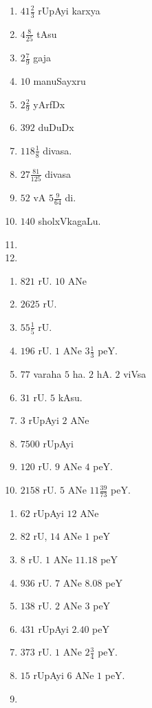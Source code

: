 
\begin{multicols}{3}
\begin{enumerate}[$(1)$]
\item $41 \frac{2}{3}$ rUpAyi karxya
\item $4 \frac{8}{25}$ tAsu
\item $2\frac{7}{9}$ gaja
\item $10$ manuSayxru
\item $2 \frac{2}{9}$ yArfDx
\item $392$ duDuDx
\item $118\frac{1}{8}$ divasa.
\item $27 \frac{81}{125}$ divasa
\item $52$ vA $5 \frac{9}{64}$ di.
\item $140$ sholxVkagaLu.
\item[]
\item[]
\end{enumerate}
\end{multicols}



\begin{multicols}{2}
\begin{enumerate}[$(1)$]
\item $821$ rU. $10$ ANe
\item $2625$ rU. 
\item $55\frac{1}{5}$ rU.
\item $196$ rU. $1$ ANe $3\frac{1}{3}$ peY.
\item $77$ varaha $5$ ha. $2$ hA. $2$ viVsa
\item $31$ rU. $5$ kAsu.
\item $3$ rUpAyi $2$ ANe
\item $7500$ rUpAyi
\item $120$ rU. $9$ ANe $4$ peY.
\item $2158$ rU. $5$ ANe $11 \frac{39}{73}$ peY.
\end{enumerate}
\end{multicols}


\begin{multicols}{3}
\begin{enumerate}[$(1)$]
\item $62$ rUpAyi $12$ ANe
\item $82$ rU, $14$ ANe $1$ peY
\item $8$ rU. $1$ ANe $11.18$ peY
\item $936$ rU. $7$ ANe $8.08$ peY 
\item $138$ rU. $2$ ANe $3$ peY
\item $431$ rUpAyi $2.40$ peY
\item $373$ rU. $1$ ANe $2\frac{3}{4}$ peY.
\item $15$ rUpAyi $6$ ANe $1$ peY.
\item[]
\end{enumerate}
\end{multicols}

